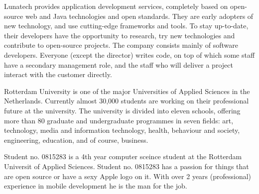 Lunatech provides application development services, completely based on open-source web and Java technologies and open standards. They are early adopters of new technology, and use cutting-edge frameworks and tools. To stay up-to-date, their developers have the opportunity to research, try new technologies and contribute to open-source projects. The company consists mainly of software developers. Everyone (except the director) writes code, on top of which some staff have a secondary management role, and the staff who will deliver a project interact with the customer directly.

Rotterdam University is one of the major Universities of Applied Sciences in the Netherlands. Currently almost 30,000 students are working on their professional future at the university.
The university is divided into eleven schools, offering more than 80 graduate and undergraduate programmes in seven fields: art, technology, media and information technology, health, behaviour and society, engineering, education, and of course, business.\cite{HogeschoolRotterdam2012}

Student no. 0815283 is a 4th year computer sceince student at the Rotterdam Universit of Applied Sciences. Student no. 0815283 has a passion for things that are open source or have a sexy Apple logo on it. With over 2 years (professional) experience in mobile development he is the man for the job.